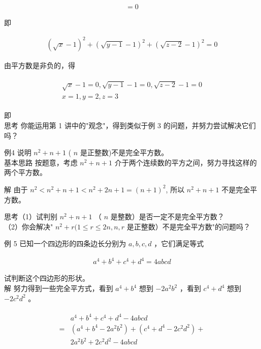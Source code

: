 \documentclass[10pt]{article}
\begin{document}
\begin{align*}
[(z-2)-2 \sqrt{z-2}+1]=0
\end{align*}

即

\begin{align*}
(\sqrt{x}-1)^{2}+(\sqrt{y-1}-1)^{2}+(\sqrt{z-2}-1)^{2}=0
\end{align*}

由平方数是非负的，得

\begin{align*}
\begin{gathered}
\sqrt{x}-1=0, \sqrt{y-1}-1=0, \sqrt{z-2}-1=0 \\
x=1, y=2, z=3
\end{gathered}
\end{align*}

即\\
思考 你能运用第 1 讲中的"观念"，得到类似于例 3 的问题，并努力尝试解决它们吗？

例4 说明 $n^{2}+n+1$ ( $n$ 是正整数)不是完全平方数。\\
基本思路 按题意，考虑 $n^{2}+n+1$ 介于两个连续数的平方之间，努力寻找这样的两个平方数。

解 由于 $n^{2}<n^{2}+n+1<n^{2}+2 n+1=(n+1)^{2}$, 所以 $n^{2}+n+1$ 不是完全平方数。

思考（1）试判别 $n^{2}+n+1$ （ $n$ 是整数）是否一定不是完全平方数？\\
（2）你会解决" $n^{2}+r(1 \leqslant r \leqslant 2 n, n, r$ 是正整数）不是完全平方数"的问题吗？

例 5 已知一个四边形的四条边长分别为 $a, b, c, d$ ，它们满足等式

\begin{align*}
a^{4}+b^{4}+c^{4}+d^{4}=4 a b c d
\end{align*}

试判断这个四边形的形状。\\
解 努力得到一些完全平方式，看到 $a^{4}+b^{4}$ 想到 $-2 a^{2} b^{2}$ ，看到 $c^{4}+d^{4}$ 想到 $-2 c^{2} d^{2}$ 。

\begin{align*}
\begin{aligned}
& a^{4}+b^{4}+c^{4}+d^{4}-4 a b c d \\
= & \left(a^{4}+b^{4}-2 a^{2} b^{2}\right)+\left(c^{4}+d^{4}-2 c^{2} d^{2}\right)+ \\
& 2 a^{2} b^{2}+2 c^{2} d^{2}-4 a b c d
\end{aligned}
\end{align*}
\end{document}

